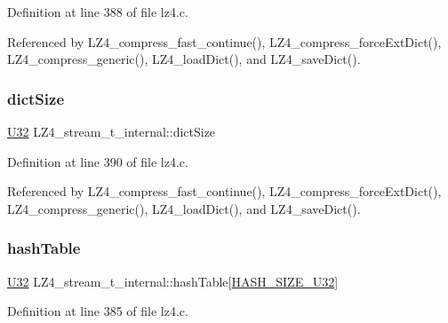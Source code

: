 Definition at line 388 of file lz4.\+c.



Referenced by L\+Z4\+\_\+compress\+\_\+fast\+\_\+continue(), L\+Z4\+\_\+compress\+\_\+force\+Ext\+Dict(), L\+Z4\+\_\+compress\+\_\+generic(), L\+Z4\+\_\+load\+Dict(), and L\+Z4\+\_\+save\+Dict().

\mbox{\label{structLZ4__stream__t__internal_a39e9e581f2a3c904bb1a912fd1611e72}} 
\subsubsection{\texorpdfstring{dict\+Size}{dictSize}}
{\footnotesize\ttfamily \mbox{\hyperlink{lz4_8c_ac3df7cf3c8cb172a588adec881447d68}{U32}} L\+Z4\+\_\+stream\+\_\+t\+\_\+internal\+::dict\+Size}



Definition at line 390 of file lz4.\+c.



Referenced by L\+Z4\+\_\+compress\+\_\+fast\+\_\+continue(), L\+Z4\+\_\+compress\+\_\+force\+Ext\+Dict(), L\+Z4\+\_\+compress\+\_\+generic(), L\+Z4\+\_\+load\+Dict(), and L\+Z4\+\_\+save\+Dict().

\mbox{\label{structLZ4__stream__t__internal_a81762be862caad87455554f2d39d4a29}} 
\subsubsection{\texorpdfstring{hash\+Table}{hashTable}}
{\footnotesize\ttfamily \mbox{\hyperlink{lz4_8c_ac3df7cf3c8cb172a588adec881447d68}{U32}} L\+Z4\+\_\+stream\+\_\+t\+\_\+internal\+::hash\+Table\mbox{[}\mbox{\hyperlink{lz4_8c_a10355a0f2e4e7f206a362ffa2272ec22}{H\+A\+S\+H\+\_\+\+S\+I\+Z\+E\+\_\+\+U32}}\mbox{]}}



Definition at line 385 of file lz4.\+c.

\mbox{\label{structLZ4__stream__t__internal_a210c641599a4633cbf4e590cbc7a0a58}} 
